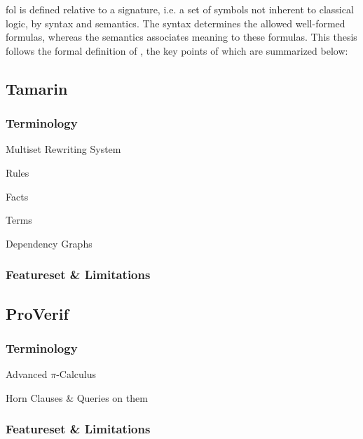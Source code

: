 \gls{fol} is defined relative to a signature, i.e. a set of symbols not inherent to classical logic, by syntax and semantics.
The syntax determines the allowed well-formed formulas, whereas the semantics associates meaning to these formulas.
This thesis follows the formal definition of \cite{schoning2008logic}, the key points of which are summarized below:

\subsection{Tamarin}
\subsubsection{Terminology}

Multiset Rewriting System

Rules

Facts

Terms

Dependency Graphs

\subsubsection{Featureset \& Limitations}

\subsection{ProVerif}

\subsubsection{Terminology}

Advanced $\pi$-Calculus

Horn Clauses \& Queries on them

\subsubsection{Featureset \& Limitations}
